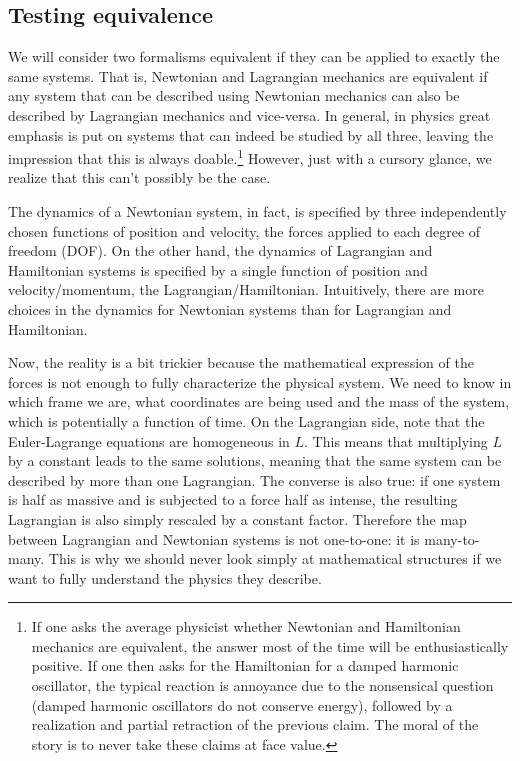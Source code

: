 \subsection{Testing equivalence}

We will consider two formalisms equivalent if they can be applied to exactly the same systems. That is, Newtonian and Lagrangian mechanics are equivalent if any system that can be described using Newtonian mechanics can also be described by Lagrangian mechanics and vice-versa. In general, in physics great emphasis is put on systems that can indeed be studied by all three, leaving the impression that this is always doable.\footnote{If one asks the average physicist whether Newtonian and Hamiltonian mechanics are equivalent, the answer most of the time will be  enthusiastically positive. If one then asks for the Hamiltonian for a damped harmonic oscillator, the typical reaction is annoyance due to the nonsensical question (damped harmonic oscillators do not conserve energy), followed by a realization and partial retraction of the previous claim. The moral of the story is to never take these claims at face value.} However, just with a cursory glance, we realize that this can't possibly be the case.

The dynamics of a Newtonian system, in fact, is specified by three independently chosen functions of position and velocity, the forces applied to each degree of freedom (DOF). On the other hand, the dynamics of Lagrangian and Hamiltonian systems is specified by a single function of position and velocity/momentum, the Lagrangian/Hamiltonian. Intuitively, there are more choices in the dynamics for Newtonian systems than for Lagrangian and Hamiltonian.

Now, the reality is a bit trickier because the mathematical expression of the forces is not enough to fully characterize the physical system. We need to know in which frame we are, what coordinates are being used and the mass of the system, which is potentially a function of time. On the Lagrangian side, note that the Euler-Lagrange equations are homogeneous in $L$. This means that multiplying $L$ by a constant leads to the same solutions, meaning that the same system can be described by more than one Lagrangian. The converse is also true: if one system is half as massive and is subjected to a force half as intense, the resulting Lagrangian is also simply rescaled by a constant factor. Therefore the map between Lagrangian and Newtonian systems is not one-to-one: it is many-to-many. This is why we should never look simply at mathematical structures if we want to fully understand the physics they describe.


